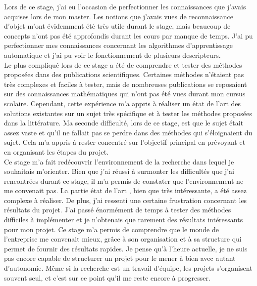 Lors de ce stage, j'ai eu l'occasion de perfectionner les connaissances que j'avais acquises lors de mon master.
Les notions que j'avais vues de reconnaissance d'objet m'ont évidemment été très utile durant le stage, mais 
beaucoup de concepts n'ont pas été approfondis durant les cours par manque de temps. J'ai pu perfectionner mes 
connaissances concernant les algorithmes d'apprentissage automatique et j'ai pu voir le fonctionnement de plusieurs
descripteurs.\\ 

Le plus compliqué lors de ce stage a été de comprendre et tester des méthodes proposées dans des publications scientifiques.
Certaines méthodes n'étaient pas très complexes et faciles à tester, mais de nombreuses publications se reposaient sur des connaissances
mathématiques qui n'ont pas été vues durant mon cursus scolaire. Cependant, cette expérience m'a appris à réaliser un état de l'art des 
solutions existantes sur un sujet très spécifique et à tester les méthodes proposées dans la littérature. Ma seconde difficulté,
lors de ce stage, est que le sujet était assez vaste et qu'il ne fallait pas se perdre dans des méthodes qui s'éloignaient du sujet.
Cela m'a appris à rester concentré sur l'objectif principal en prévoyant et en organisant les étapes du projet.\\ 

Ce stage m'a fait redécouvrir l'environnement de la recherche dans lequel je souhaitais m'orienter. Bien que j'ai réussi à surmonter
les difficultés que j'ai rencontrées durant ce stage, il m'a permis de constater que l'environnement ne me convenait pas. La partie 
\og état de l'art \fg, bien que très intéressante, a été assez complexe à réaliser. De plus, j'ai ressenti une certaine frustration
concernant les résultats du projet. J'ai passé énormément de temps à tester des méthodes difficiles à implémenter et je n'obtenais
que rarement des résultats intéressants pour mon projet. Ce stage m'a permis de comprendre que le monde de l'entreprise me
convenait mieux, grâce à son organisation et à sa structure qui permet de fournir des résultats 
rapides. Je pense qu'à l'heure actuelle, je ne suis pas encore capable de structurer un projet pour
le mener à bien avec autant d'autonomie. Même si la recherche est un travail d'équipe, les projets 
s'organisent souvent seul, et c'est sur ce point qu'il me reste encore à progresser.
